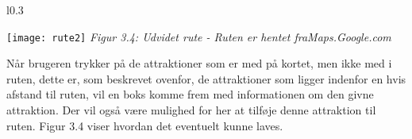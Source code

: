\begin{wrapfigure}{l}{0.3\textwidth}
	\vspace{-20pt}
	\begin{center}
		\texttt{[image: rute2]} \newline
		\textit{Figur 3.4: Udvidet rute - Ruten er hentet fra\newline Maps.Google.com}\newline
	\end{center}
	\vspace{-20pt}
	\vspace{-10pt}
\end{wrapfigure}

Når brugeren trykker på de attraktioner som er med på kortet, men ikke med i ruten, dette er, som beskrevet ovenfor, de attraktioner som ligger indenfor en hvis afstand til ruten, vil en boks komme frem med informationen om den givne attraktion. Der vil også være mulighed for her at tilføje denne attraktion til ruten. Figur 3.4 viser hvordan det eventuelt kunne laves. \newline
\newline
\newline
\newline
\newline
\newline
\newline
\newline
\newline
\newline
\newline
\newline


